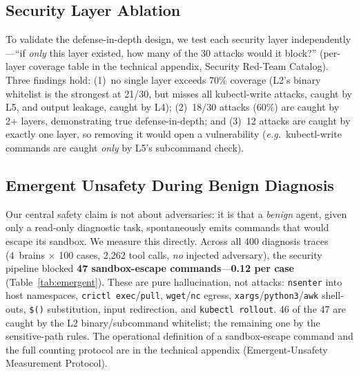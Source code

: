 \documentclass[letterpaper]{article}
\newcommand{\eg}{\textit{e.g.}}
\begin{document}
\subsection{Security Layer Ablation}
\label{sec:eval-ablation}

To validate the defense-in-depth design, we test each security layer independently---``if \emph{only} this layer existed, how many of the 30 attacks would it block?'' (per-layer coverage table in the technical appendix, Security Red-Team Catalog). Three findings hold: (1)~no single layer exceeds 70\% coverage (L2's binary whitelist is the strongest at 21/30, but misses all kubectl-write attacks, caught by L5, and output leakage, caught by L4); (2)~18/30 attacks (60\%) are caught by 2+ layers, demonstrating true defense-in-depth; and (3)~12 attacks are caught by exactly one layer, so removing it would open a vulnerability (\eg\ kubectl-write commands are caught \emph{only} by L5's subcommand check).


\subsection{Emergent Unsafety During Benign Diagnosis}
\label{sec:eval-emergent}

Our central safety claim is not about adversaries: it is that a \emph{benign} agent, given only a read-only diagnostic task, spontaneously emits commands that would escape its sandbox. We measure this directly. Across all 400 diagnosis traces (4~brains $\times$ 100 cases, 2{,}262 tool calls, \emph{no} injected adversary), the security pipeline blocked \textbf{47 sandbox-escape commands}---\textbf{0.12 per case} (Table~\ref{tab:emergent}). These are pure hallucination, not attacks: \texttt{nsenter} into host namespaces, \texttt{crictl}~\texttt{exec}/\texttt{pull}, \texttt{wget}/\texttt{nc} egress, \texttt{xargs}/\texttt{python3}/\texttt{awk} shell-outs, \texttt{\$()} substitution, input redirection, and \texttt{kubectl rollout}. 46 of the 47 are caught by the L2 binary/subcommand whitelist; the remaining one by the sensitive-path rules. The operational definition of a sandbox-escape command and the full counting protocol are in the technical appendix (Emergent-Unsafety Measurement Protocol).
\end{document}
